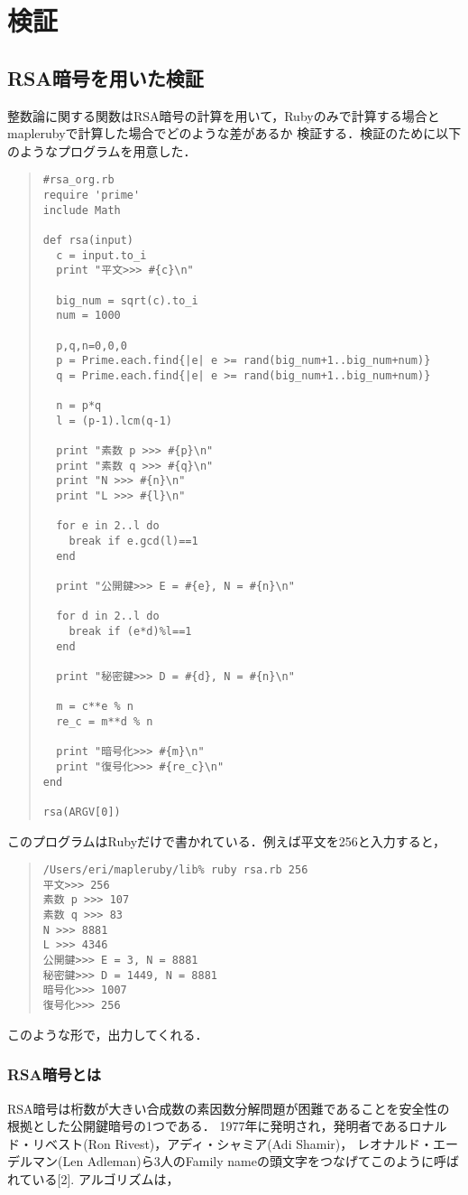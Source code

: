 \section{検証}
\subsection{RSA暗号を用いた検証}
整数論に関する関数はRSA暗号の計算を用いて，Rubyのみで計算する場合とmaplerubyで計算した場合でどのような差があるか
検証する．検証のために以下のようなプログラムを用意した．
\begin{quote}\begin{verbatim}
#rsa_org.rb
require 'prime'
include Math

def rsa(input)
  c = input.to_i
  print "平文>>> #{c}\n"
  
  big_num = sqrt(c).to_i
  num = 1000
  
  p,q,n=0,0,0
  p = Prime.each.find{|e| e >= rand(big_num+1..big_num+num)}
  q = Prime.each.find{|e| e >= rand(big_num+1..big_num+num)}
  
  n = p*q
  l = (p-1).lcm(q-1)
  
  print "素数 p >>> #{p}\n"
  print "素数 q >>> #{q}\n"
  print "N >>> #{n}\n"
  print "L >>> #{l}\n"
  
  for e in 2..l do
    break if e.gcd(l)==1
  end
  
  print "公開鍵>>> E = #{e}, N = #{n}\n"
  
  for d in 2..l do
    break if (e*d)%l==1
  end
  
  print "秘密鍵>>> D = #{d}, N = #{n}\n"
  
  m = c**e % n
  re_c = m**d % n
  
  print "暗号化>>> #{m}\n"
  print "復号化>>> #{re_c}\n"
end

rsa(ARGV[0])
\end{verbatim}\end{quote}
このプログラムはRubyだけで書かれている．例えば平文を256と入力すると，
\begin{quote}\begin{verbatim}
/Users/eri/mapleruby/lib% ruby rsa.rb 256
平文>>> 256
素数 p >>> 107
素数 q >>> 83
N >>> 8881
L >>> 4346
公開鍵>>> E = 3, N = 8881
秘密鍵>>> D = 1449, N = 8881
暗号化>>> 1007
復号化>>> 256
\end{verbatim}\end{quote}
このような形で，出力してくれる．

\subsubsection{RSA暗号とは}
RSA暗号は桁数が大きい合成数の素因数分解問題が困難であることを安全性の根拠とした公開鍵暗号の1つである．
1977年に発明され，発明者であるロナルド・リベスト(Ron Rivest)，アディ・シャミア(Adi Shamir)，
レオナルド・エーデルマン(Len Adleman)ら3人のFamily nameの頭文字をつなげてこのように呼ばれている[2].
アルゴリズムは，

